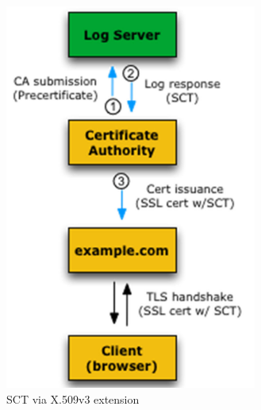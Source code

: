 \begin{figure}[H]
  \centering
  \begin{subfigure}[b]{0.2\textwidth}
    \includegraphics[width=\textwidth]{img/x509 stc v3.png}
    \caption{SCT via X.509v3 extension}
    \label{fig:ct x509}
  \end{subfigure}
  \hfill
  \begin{subfigure}[b]{0.3\textwidth}

\end{subfigure}
\end{figure}
